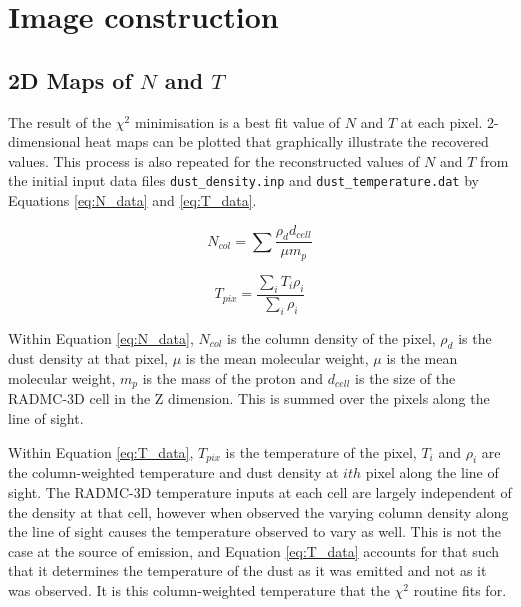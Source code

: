 \documentclass{report}
\begin{document}
\section{Image construction} \label{sec:imag_construct}

\subsection{2D Maps of $N$ and $T$}
The result of the $\chi^{2}$ minimisation is a best fit value of $N$ and $T$ at each pixel. 2-dimensional heat maps can be plotted that graphically illustrate the recovered values. This process is also repeated for the reconstructed values of $N$ and $T$ from the initial input data files \texttt{dust\_density.inp} and \texttt{dust\_temperature.dat} by Equations \ref{eq:N_data} and \ref{eq:T_data}.

\noindent\begin{minipage}{.5\linewidth}
\begin{equation}
  N_{col} = \sum{\frac{\rho_{d}d_{cell}}{\mu m_{p}}}
  \label{eq:N_data}
\end{equation}
\end{minipage}%
\begin{minipage}{.5\linewidth}
\begin{equation}
  T_{pix} = \frac{\sum_{i} T_{i} \rho_{i}}{\sum_{i} \rho_{i}}
  \label{eq:T_data}
\end{equation}
\end{minipage}

Within Equation \ref{eq:N_data}, $N_{col}$ is the column density of the pixel, $\rho_{d}$ is the dust density at that pixel, $\mu$ is the mean molecular weight, $\mu$ is the mean molecular weight, $m_{p}$ is the mass of the proton and $d_{cell}$ is the size of the RADMC-3D cell in the Z dimension. This is summed over the pixels along the line of sight.

Within Equation \ref{eq:T_data}, $T_{pix}$ is the temperature of the pixel, $T_{i}$ and $\rho_{i}$ are the column-weighted temperature and dust density at $ith$ pixel along the line of sight. The RADMC-3D temperature inputs at each cell are largely independent of the density at that cell, however when observed the varying column density along the line of sight causes the temperature observed to vary as well. This is not the case at the source of emission, and Equation \ref{eq:T_data} accounts for that such that it determines the temperature of the dust as it was emitted and not as it was observed. It is this column-weighted temperature that the $\chi^{2}$ routine fits for.
\end{document}
